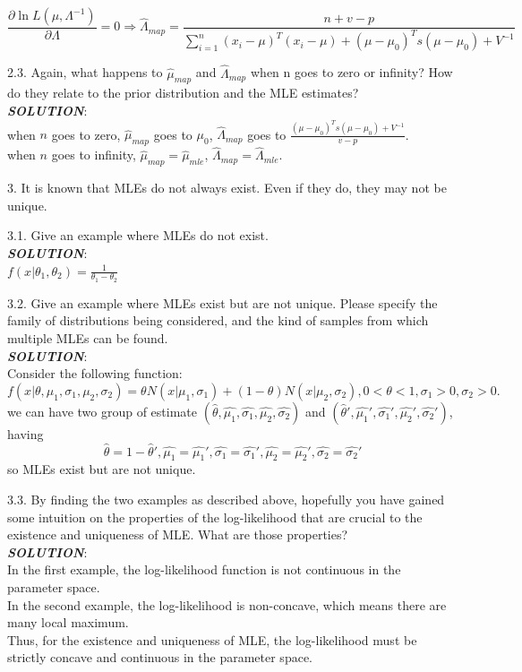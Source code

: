 \documentclass{article}
\theoremstyle{definition}
\theoremstyle{definition}
\theoremstyle{remark}
\begin{document}
\[\frac{\partial \ln L(\mu,\Lambda^{-1})}{\partial\Lambda}=0 \Rightarrow \hat{\Lambda}_{map}=\frac{n+v-p}{\sum\limits_{i=1}^{n}(x_i-\mu)^T(x_i-\mu)+ (\mu-\mu_0)^Ts(\mu-\mu_0)+V^{-1}}\]

2.3. Again, what happens to $\hat{\mu}_{map}$ and $\hat{\Lambda}_{map}$ when n goes to zero or infinity?
How do they relate to the prior distribution and the MLE
estimates?\\
\emph{\textbf{SOLUTION}}:\\
when $n$ goes to zero, $\hat{\mu}_{map}$ goes to $\mu_0$, $\hat{\Lambda}_{map}$  goes to $\frac{(\mu-\mu_0)^Ts(\mu-\mu_0)+V^{-1}}{v-p}$.\\
when $n$ goes to infinity, $\hat{\mu}_{map}=\hat{\mu}_{mle}$, $\hat{\Lambda}_{map}=\hat{\Lambda}_{mle}$.

3. It is known that MLEs do not always exist. Even if they do, they may not be unique.

3.1. Give an example where MLEs do not exist.\\
\emph{\textbf{SOLUTION}}:\\
$f(x|\theta_1,\theta_2)=\frac{1}{\theta_1-\theta_2}$

3.2. Give an example where MLEs exist but are not unique. Please specify the family of distributions being considered, and the kind of samples from which multiple MLEs can be found.\\
\emph{\textbf{SOLUTION}}:\\
Consider the following function:
\[f(x|\theta,\mu_1,\sigma_1,\mu_2,\sigma_2) = \theta N(x|\mu_1,\sigma_1)+(1-\theta)N(x|\mu_2,\sigma_2), 0<\theta<1, \sigma_1>0,\sigma_2>0.\]
we can have two group of estimate $(\hat{\theta},\hat{\mu_1},\hat{\sigma_1},\hat{\mu_2},\hat{\sigma_2})$
and $(\hat{\theta}',\hat{\mu_1}',\hat{\sigma_1}',\hat{\mu_2}',\hat{\sigma_2}')$, having
\[\hat{\theta}=1-\hat{\theta}',\hat{\mu_1}=\hat{\mu_1}',\hat{\sigma_1}=\hat{\sigma_1}',\hat{\mu_2}=\hat{\mu_2}',\hat{\sigma_2}=\hat{\sigma_2}'\]
so MLEs exist but are not unique.

3.3. By finding the two examples as described above, hopefully you have gained some intuition
on the properties of the log-likelihood that are crucial to the existence and uniqueness of MLE. What
are those properties?\\
\emph{\textbf{SOLUTION}}:\\
In the first example, the log-likelihood function is not continuous in the parameter space.\\
In the second example, the log-likelihood is non-concave, which means there are many local maximum.\\
Thus, for the existence and uniqueness of MLE, the log-likelihood must be strictly concave and continuous in the parameter space.
\end{document}
